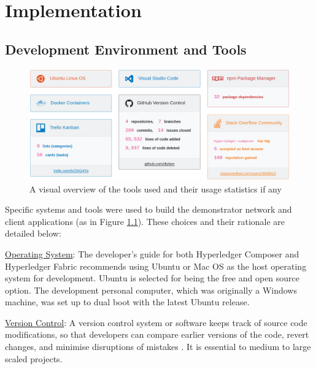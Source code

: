 \chapter{Implementation}

\graphicspath{{Chapter6/Figs/Raster/}{Chapter6/Figs/}}

\section{Development Environment and Tools}

\begin{figure}[!ht]
	\centering
	\includegraphics[width=1.0\textwidth]{platform_stats}
	\caption[Development Tools and Usage Statistics]
	{A visual overview of the tools used and their usage statistics if any}
	\label{fig:platform_stats}
\end{figure}

Specific systems and tools were used to build the demonstrator network and client applications (as in Figure \ref{fig:platform_stats}).
These choices and their rationale are detailed below:

\underline{Operating System}: The developer's guide for both Hyperledger Composer and Hyperledger Fabric
recommends using Ubuntu or Mac OS as the host operating system for development.
Ubuntu is selected for being the free and open source option. The development personal computer, which was originally
a Windows machine, was set up to dual boot with the latest Ubuntu release.

\underline{Version Control}: A version control system or software keeps track of source code modifications,
so that developers can compare earlier versions of the code, revert changes, and
minimise disruptions of mistakes \citep{atlassian2018vcs}. It is essential to medium to large scaled projects.

